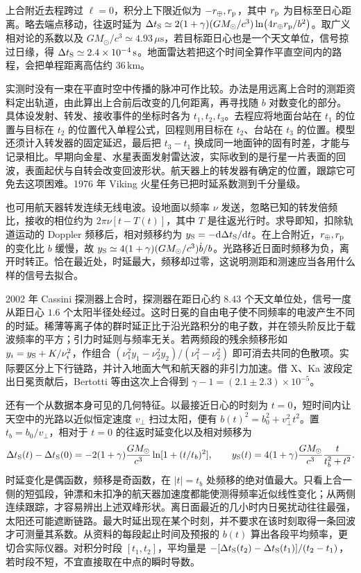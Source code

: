 上合附近去程跨过 $\ell=0$，积分上下限近似为 $-r_\oplus,r_{\rm p}$，其中 $r_{\rm p}$ 为目标至日心距离。略去端点移动，往返时延为 $\Delta t_{\rm S}\simeq 2(1+\gamma)(GM_\odot/c^3)\ln(4r_\oplus r_{\rm p}/b^2)$。取广义相对论的系数以及 $GM_\odot/c^3\simeq4.93\,\mu\mathrm{s}$，若目标距日心也是一个天文单位，信号掠过日缘，得 $\Delta t_{\rm S}\simeq 2.4\times10^{-4}\,\mathrm{s}$。地面雷达若把这个时间全算作平直空间内的路程，会把单程距离高估约 $36\,\mathrm{km}$。

实测时没有一束在平直时空中传播的脉冲可作比较。办法是用远离上合时的测距资料定出轨道，由此算出上合前后改变的几何距离，再寻找随 $b$ 对数变化的部分。具体设发射、转发、接收事件的坐标时各为 $t_1,t_2,t_3$。去程应将地面台站在 $t_1$ 的位置与目标在 $t_2$ 的位置代入单程公式，回程则用目标在 $t_2$、台站在 $t_3$ 的位置。模型还须计入转发器的固定延迟，最后把 $t_3-t_1$ 换成同一地面钟的固有时差，才能与记录相比。早期向金星、水星表面发射雷达波，实际收到的是行星一片表面的回波，表面起伏与自转会改变回波形状。航天器上的转发器有确定的位置，跟踪它可免去这项困难。1976 年 Viking 火星任务已把时延系数测到千分量级。

也可用航天器转发连续无线电波。设地面以频率 $\nu$ 发送，忽略已知的转发倍频比，接收的相位约为 $2\pi\nu[t-T(t)]$，其中 $T$ 是往返光行时。求导即知，扣除轨道运动的 Doppler 频移后，相对频移约为 $y_{\rm S}=-\dd\Delta t_{\rm S}/\dd t$。在上合附近，$r_\oplus,r_{\rm p}$ 的变化比 $b$ 缓慢，故 $y_{\rm S}\simeq4(1+\gamma)(GM_\odot/c^3)\dot b/b$。光路移近日面时频移为负，离开时转正。恰在最近处，时延最大，频移却过零，这说明测距和测速应当各用什么样的信号去拟合。

2002 年 Cassini 探测器上合时，探测器在距日心约 $8.43$ 个天文单位处，信号一度从距日心 $1.6$ 个太阳半径处经过。这时日冕的自由电子使不同频率的电波产生不同的时延。稀薄等离子体的群时延正比于沿光路积分的电子数，并在领头阶反比于载波频率的平方；引力时延则与频率无关。若两频段的残余频移形如 $y_i=y_{\rm S}+K/\nu_i^2$，作组合 $(\nu_1^2y_1-\nu_2^2y_2)/(\nu_1^2-\nu_2^2)$ 即可消去共同的色散项。实际要区分上下行链路，并计入地面大气和航天器的非引力加速。借 X、Ka 波段定出日冕贡献后，Bertotti 等由这次上合得到 $\gamma-1=(2.1\pm2.3)\times10^{-5}$。

还有一个从数据本身可见的几何特征。以最接近日心的时刻为 $t=0$，短时间内让天空中的光路以近似恒定速度 $v_\perp$ 扫过太阳，便有 $b(t)^2=b_0^2+v_\perp^2t^2$。置 $t_b=b_0/v_\perp$，相对于 $t=0$ 的往返时延变化以及相对频移为
\[
 \Delta t_{\rm S}(t)-\Delta t_{\rm S}(0)
   =-2(1+\gamma)\frac{GM_\odot}{c^3}\ln[1+(t/t_b)^2],
 \qquad
 y_{\rm S}(t)=4(1+\gamma)\frac{GM_\odot}{c^3}\frac{t}{t_b^2+t^2}.
\]
时延变化是偶函数，频移是奇函数，在 $|t|=t_b$ 处频移的绝对值最大。只看上合一侧的短弧段，钟漂和未扣净的航天器加速度都能使测得频率近似线性变化；从两侧连续跟踪，才容易辨出上述双峰形状。离日面最近的几小时内日冕扰动往往最强，太阳还可能遮断链路。最大时延出现在某个时刻，并不要求在该时刻取得一条回波才可测量其系数。从资料的每段起止时间及预报的 $b(t)$ 算出各段平均频率，更切合实际仪器。对积分时段 $[t_1,t_2]$，平均量是 $-[\Delta t_{\rm S}(t_2)-\Delta t_{\rm S}(t_1)]/(t_2-t_1)$，若时段不短，不宜直接取在中点的瞬时导数。

